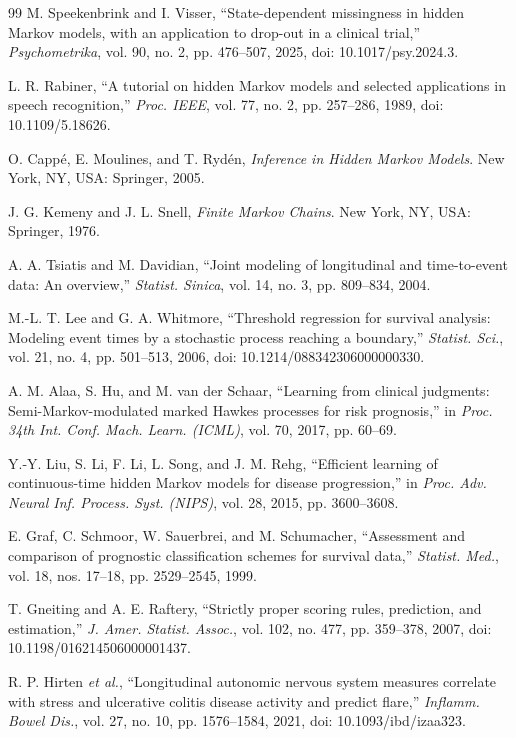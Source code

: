 \documentclass{ieeeaccess}
\begin{document}
\begin{thebibliography}{99}
 M. Speekenbrink and I. Visser, ``State-dependent missingness in hidden Markov models, with an application to drop-out in a clinical trial,'' \emph{Psychometrika}, vol. 90, no. 2, pp. 476--507, 2025, doi: 10.1017/psy.2024.3.

 L. R. Rabiner, ``A tutorial on hidden Markov models and selected applications in speech recognition,'' \emph{Proc. IEEE}, vol. 77, no. 2, pp. 257--286, 1989, doi: 10.1109/5.18626.

 O. Capp\'e, E. Moulines, and T. Ryd\'en, \emph{Inference in Hidden Markov Models}. New York, NY, USA: Springer, 2005.

 J. G. Kemeny and J. L. Snell, \emph{Finite Markov Chains}. New York, NY, USA: Springer, 1976.

 A. A. Tsiatis and M. Davidian, ``Joint modeling of longitudinal and time-to-event data: An overview,'' \emph{Statist. Sinica}, vol. 14, no. 3, pp. 809--834, 2004.

 M.-L. T. Lee and G. A. Whitmore, ``Threshold regression for survival analysis: Modeling event times by a stochastic process reaching a boundary,'' \emph{Statist. Sci.}, vol. 21, no. 4, pp. 501--513, 2006, doi: 10.1214/088342306000000330.

 A. M. Alaa, S. Hu, and M. van der Schaar, ``Learning from clinical judgments: Semi-Markov-modulated marked Hawkes processes for risk prognosis,'' in \emph{Proc. 34th Int. Conf. Mach. Learn. (ICML)}, vol. 70, 2017, pp. 60--69.

 Y.-Y. Liu, S. Li, F. Li, L. Song, and J. M. Rehg, ``Efficient learning of continuous-time hidden Markov models for disease progression,'' in \emph{Proc. Adv. Neural Inf. Process. Syst. (NIPS)}, vol. 28, 2015, pp. 3600--3608.

 E. Graf, C. Schmoor, W. Sauerbrei, and M. Schumacher, ``Assessment and comparison of prognostic classification schemes for survival data,'' \emph{Statist. Med.}, vol. 18, nos. 17--18, pp. 2529--2545, 1999.

 T. Gneiting and A. E. Raftery, ``Strictly proper scoring rules, prediction, and estimation,'' \emph{J. Amer. Statist. Assoc.}, vol. 102, no. 477, pp. 359--378, 2007, doi: 10.1198/016214506000001437.

 R. P. Hirten \emph{et al.}, ``Longitudinal autonomic nervous system measures correlate with stress and ulcerative colitis disease activity and predict flare,'' \emph{Inflamm. Bowel Dis.}, vol. 27, no. 10, pp. 1576--1584, 2021, doi: 10.1093/ibd/izaa323.


\end{thebibliography}
\end{document}
